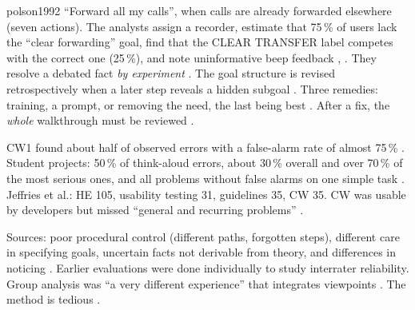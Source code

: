 \begin{papercard}{polson1992}
 ``Forward all my calls'', when calls are already forwarded elsewhere (seven actions). The analysts assign a recorder, estimate that 75\,\% of users lack the ``clear forwarding'' goal, find that the CLEAR TRANSFER label competes with the correct one (25\,\%), and note uninformative beep feedback , . They resolve a debated fact \emph{by experiment} . The goal structure is revised retrospectively when a later step reveals a hidden subgoal . Three remedies: training, a prompt, or removing the need, the last being best . After a fix, the \emph{whole} walkthrough must be reviewed .

 CW1 found about half of observed errors with a false-alarm rate of almost 75\,\% . Student projects: 50\,\% of think-aloud errors, about 30\,\% overall and over 70\,\% of the most serious ones, and all problems without false alarms on one simple task . Jeffries et al.: HE 105, usability testing 31, guidelines 35, CW 35. CW was usable by developers but missed ``general and recurring problems'' .

 Sources: poor procedural control (different paths, forgotten steps), different care in specifying goals, uncertain facts not derivable from theory, and differences in noticing . Earlier evaluations were done individually to study interrater reliability. Group analysis was ``a very different experience'' that integrates viewpoints . The method is tedious .


\end{papercard}
